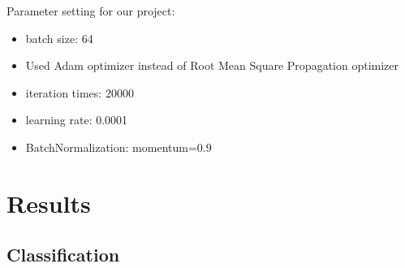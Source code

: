 \documentclass[conference]{IEEEtran}
\begin{document}
    Parameter setting for our project:

    \begin{itemize}
        \item batch size: 64
        \item Used Adam optimizer instead of Root Mean Square Propagation optimizer
        \item iteration times: 20000
        \item learning rate: 0.0001
        \item BatchNormalization: momentum=0.9
    \end{itemize}

    \section{Results}\label{sec:results}

    \subsection{Classification}\label{subsec:results-classification}
\end{document}
